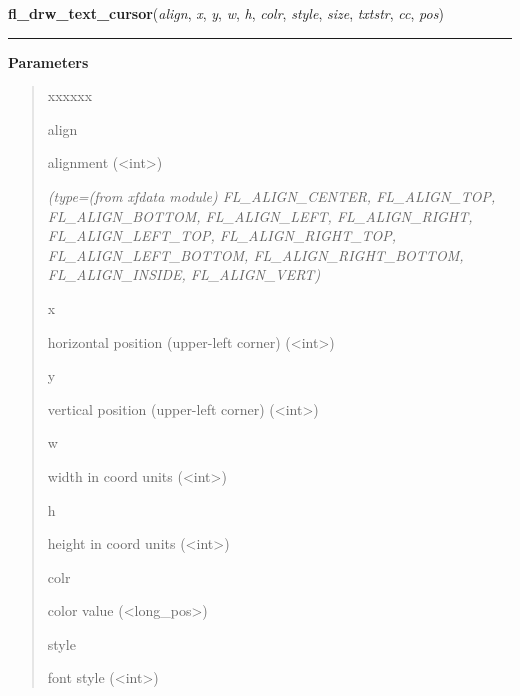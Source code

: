 \hspace{.8\funcindent}\begin{boxedminipage}{\funcwidth}

    \raggedright \textbf{fl\_drw\_text\_cursor}(\textit{align}, \textit{x}, \textit{y}, \textit{w}, \textit{h}, \textit{colr}, \textit{style}, \textit{size}, \textit{txtstr}, \textit{cc}, \textit{pos})

    \vspace{-1.5ex}

    \rule{\textwidth}{0.5\fboxrule}
\setlength{\parskip}{2ex}
\setlength{\parskip}{1ex}
      \textbf{Parameters}
      \vspace{-1ex}

      \begin{quote}
        \begin{Ventry}{xxxxxx}

          \item[align]

          alignment ({\textless}int{\textgreater})

            {\it (type=(from xfdata module) FL\_ALIGN\_CENTER, FL\_ALIGN\_TOP, FL\_ALIGN\_BOTTOM, 
FL\_ALIGN\_LEFT, FL\_ALIGN\_RIGHT, FL\_ALIGN\_LEFT\_TOP, 
FL\_ALIGN\_RIGHT\_TOP, FL\_ALIGN\_LEFT\_BOTTOM, FL\_ALIGN\_RIGHT\_BOTTOM, 
FL\_ALIGN\_INSIDE, FL\_ALIGN\_VERT)}

          \item[x]

          horizontal position (upper-left corner) 
          ({\textless}int{\textgreater})

          \item[y]

          vertical position (upper-left corner) 
          ({\textless}int{\textgreater})

          \item[w]

          width in coord units ({\textless}int{\textgreater})

          \item[h]

          height in coord units ({\textless}int{\textgreater})

          \item[colr]

          color value ({\textless}long\_pos{\textgreater})

          \item[style]

          font style ({\textless}int{\textgreater})


\end{Ventry}
\end{quote}
\end{boxedminipage}
